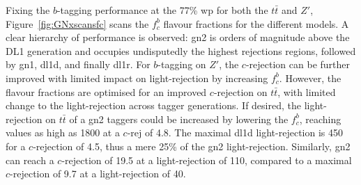 Fixing the $b$-tagging performance at the 77\% \gls{wp} for both the $t\bar{t}$ and $Z'$, Figure~\ref{fig:GNxscansfc} scans the $f^b_c$ flavour fractions for the different models. A clear hierarchy of performance is observed: \gls{gn2} is orders of magnitude above the DL1 generation and occupies undisputedly the highest rejections regions, followed by \gls{gn1}, \gls{dl1d}, and finally \gls{dl1r}. For $b$-tagging on $Z'$, the $c$-rejection can be further improved with limited impact on light-rejection by increasing $f^b_c$. However, the flavour fractions are optimised for an improved $c$-rejection on $t\bar{t}$, with limited change to the light-rejection across tagger generations. If desired, the light-rejection on $t\bar{t}$ of a \gls{gn2} taggers could be increased by lowering the $f^b_c$, reaching values as high as 1800 at a $c$-rej of 4.8. The maximal \gls{dl1d} light-rejection is 450 for a $c$-rejection of 4.5, thus a mere 25\% of the \gls{gn2} light-rejection. Similarly, \gls{gn2} can reach a $c$-rejection of 19.5 at a light-rejection of 110, compared to a maximal $c$-rejection of 9.7 at a light-rejection of 40. 

